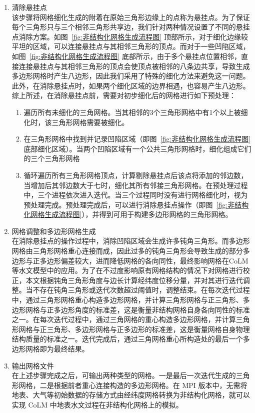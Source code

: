 \begin{enumerate}
  \item 清除悬挂点\\
    该步骤将网格细化生成的附着在原始三角形边缘上的点称为悬挂点。为了保证每个三角形只与三个相邻三角形共享边，我们针对两种情况设置了不同的悬挂点消除方案。如图~\ref{fig:非结构化网格生成流程图} 顶部所示，对于细化边缘较平坦的区域，可以连接悬挂点与其相邻三角形的顶点。而对于一些凹陷区域，如图~\ref{fig:非结构化网格生成流程图} 底部所示，由于多个悬挂点位置相邻，直接连接悬挂点与其相邻三角形的顶点会使顶点被相邻的八条边共享，导致生成多边形网格时产生八边形，因此我们采用了特殊的细化方法来避免这一问题。此外，在消除悬挂点时，如果两个细化区域的边界相遇，也容易产生八边形。综上所述，在消除悬挂点前，需要对初步细化后的网格进行如下预处理：
    \begin{enumerate}
      \item 遍历所有未细化的三角网格。当其相邻的3个三角形网格中有1个以上被细化时，该三角形网格需要被细化。
      \item 在三角形网格中找到并记录凹陷区域（即图~\ref{fig:非结构化网格生成流程图} 底部细化区域）。当两个凹陷区域有一个公共三角形网格时，细化组成它们的三个三角形网格
      \item 循环遍历所有三角形网格顶点，计算剔除悬挂点后该点将添加的邻边数，当增加后其邻边数大于七时，细化其所有邻接三角形网格。在预处理过程中，三个进程依次进入迭代。当三个过程同时没有进行网格细化时，视为预处理完成。预处理完成后，可以进行消除悬挂点操作（即图~\ref{fig:非结构化网格生成流程图}），并得到可用于构建多边形网格的三角形网格。
    \end{enumerate}
  \item 网格调整和多边形网格生成\\
    在消除悬挂点的操作过程中，消除凹陷区域会生成许多钝角三角形。而多边形网格由三角形网格重心连接而成，因此过多的钝角三角形会导致生成的部分多边形与正多边形偏差较大，进而降低网格的各向同性，最终影响网格在CoLM等水文模型中的应用。为了在不过度影响原有网格结构的情况下对网格进行校正，本文根据钝角三角形角度与边长计算经纬度位移分量，并对其进行迭代调整。当不存在钝角三角形或迭代次数超过阈值时，调整结束。在每次迭代过程中，通过三角形网格重心构造多边形网格，并计算三角形网格与正三角形、多边形网格与正多边形角度的标准差，这是衡量非结构网格自身各向同性的标准之一。在每次迭代过程中，通过三角网格的重心构造多边形网格，并计算三角形网格与正三角形、多边形网格与正多边形的标准差，这是衡量网格自身物理结构质量的标准之一。迭代完成后，通过三角网格重心所构造处的最后一个多边形网格即为最终结果。
  \item 输出网格文件\\
    在上述步骤完成之后，可输出两种类型的网格。一是最后一次迭代生成的三角形网格，二是根据前者重心连接构造的多边形网格。在 MPI 版本中，无需将地表、大气等初始数据的存储方式由经纬度网格转换为非结构化网格，就可以实现 CoLM 中地表水文过程在非结构化网格上的模拟。
\end{enumerate}


